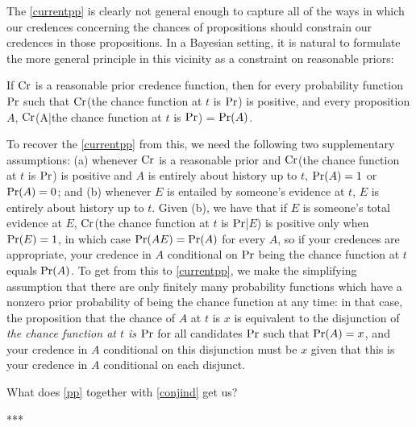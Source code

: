 \documentclass[If.tex]{subfiles}
\begin{document}
The \ref{currentpp} is clearly not general enough to capture all of the ways in which our credences concerning the chances of propositions should constrain our credences in those propositions.  In a Bayesian setting, it is natural to formulate the more general principle in this vicinity as a constraint on reasonable priors:  
\begin{prop}
	 \label{pp}
	If $\operatorname{Cr}$ is a reasonable prior credence function, then for every probability function $\operatorname{Pr}$ such that $\operatorname{Cr}$(the chance function at $t$ is $\operatorname{Pr}$) is positive, and every proposition $A$, $\operatorname{Cr}$(A|the chance function at $t$ is $\operatorname{Pr}$) = $\operatorname{Pr}(A)$.  
\end{prop}
To recover the \ref{currentpp} from this, we need the following two supplementary assumptions: (a) whenever $\operatorname{Cr}$ is a reasonable prior and $\operatorname{Cr}$(the chance function at $t$ is $\operatorname{Pr}$) is positive and $A$ is entirely about history up to $t$, $\operatorname{Pr}(A) = 1$ or $\operatorname{Pr}(A) = 0$; and (b) whenever $E$ is entailed by someone's evidence at $t$, $E$ is entirely about history up to $t$.  Given (b), we have that if $E$ is someone's total evidence at $E$, $\operatorname{Cr}$(the chance function at $t$ is $\operatorname{Pr}$|$E$) is positive only when $\operatorname{Pr}(E) = 1$, in which case $\operatorname{Pr}(AE) = \operatorname{Pr}(A)$ for every $A$, so if your credences are appropriate, your credence in $A$ conditional on $\operatorname{Pr}$ being the chance function at $t$ equals $\operatorname{Pr}(A)$. To get from this to \ref{currentpp}, we make the simplifying assumption that there are only finitely many probability functions which have a nonzero prior probability of being the chance function at any time: in that case, the proposition that the chance of $A$ at $t$ is $x$ is equivalent to the disjunction of \emph{the chance function at $t$ is $\operatorname{Pr}$} for all candidates $\operatorname{Pr}$ such that $\operatorname{Pr}(A) = x$, and your credence in $A$ conditional on this disjunction must be $x$ given that this is your credence in $A$ conditional on each disjunct.  

What does \ref{pp} together with \ref{conjind} get us?  

***
\end{document}

